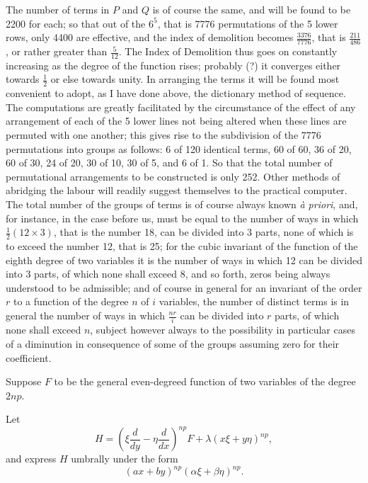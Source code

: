 \documentclass[11pt]{article}
\begin{document}
{The number of terms in $P$ and $Q$ is of course the same, and will be found to be 2200 for each; so that out of the $6^5$, that is 7776 permutations of the 5 lower rows, only 4400 are effective, and the index of demolition becomes $\frac{3376}{7776}$, that is $\frac{211}{486}$, or rather greater than $\frac{5}{12}$. The Index of Demolition thus goes on constantly increasing as the degree of the function rises; probably (?) it converges either towards $\frac12$ or else towards unity. In arranging the terms it will be found most convenient to adopt, as I have done above, the dictionary method of sequence. The computations are greatly facilitated by the circumstance of the effect of any arrangement of each of the 5 lower lines not being altered when these lines are permuted with one another; this gives rise to the subdivision of the 7776 permutations into groups as follows: 6 of 120 identical terms, 60 of 60, 36 of 20, 60 of 30, 24 of 20, 30 of 10, 30 of 5, and 6 of 1. So that the total number of permutational arrangements to be constructed is only 252. Other methods of abridging the labour will readily suggest themselves to the practical computer. The total number of the groups of terms is of course always known \emph{à priori}, and, for instance, in the case before us, must be equal to the number of ways in which $\frac12(12\times3)$, that is the number 18, can be divided into 3 parts, none of which is to exceed the number 12, that is 25; for the cubic invariant of the function of the eighth degree of two variables it is the number of ways in which 12 can be divided into 3 parts, of which none shall exceed 8, and so forth, zeros being always understood to be admissible; and of course in general for an invariant of the order $r$ to a function of the degree $n$ of $i$ variables, the number of distinct terms is in general the number of ways in which $\frac{nr}{i}$ can be divided into $r$ parts, of which none shall exceed $n$, subject however always to the possibility in particular cases of a diminution in consequence of some of the groups assuming zero for their coefficient.}

Suppose $F$ to be the general even-degreed function of two variables of the degree $2np$.

Let
\[
H=\left(\xi\frac{d}{dy}-\eta\frac{d}{dx}\right)^{np}F+\lambda(x\xi+y\eta)^{np},
\]
and express $H$ umbrally under the form
\[
(ax+by)^{np}(\alpha\xi+\beta\eta)^{np}.
\]
\end{document}
